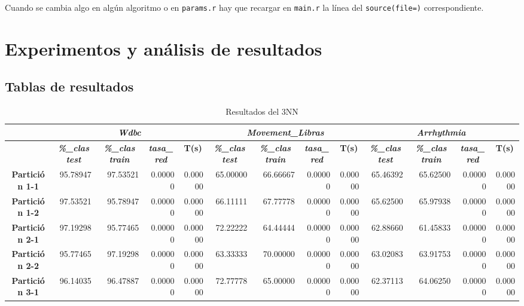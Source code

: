 \documentclass[a4paper,11pt]{article}
\begin{document}
 Cuando se cambia algo en algún algoritmo o en \texttt{params.r} hay que recargar en \texttt{main.r}
 la línea del \texttt{source(file=)} correspondiente.
 
 \section{Experimentos y análisis de resultados}
 \subsection{Tablas de resultados}
 \begin{table}[H]	
    \caption*{Resultados del 3NN}
    \begin{adjustbox}{width=1.1\textwidth}
    \begin{tabular}{|c|r|r|r|r|r|r|r|r|r|r|r|r|}
    \hline
    \multicolumn{1}{|l|}{} & \multicolumn{ 4}{c|}{\textbf{\textit{Wdbc}}} & \multicolumn{ 4}{c|}{\textbf{\textit{Movement\_Libras}}} & \multicolumn{ 4}{c|}{\textbf{\textit{Arrhythmia}}} \\ \hline
    & \multicolumn{1}{c|}{\textbf{\textit{\%\_clas test}}} & \multicolumn{1}{c|}{\textbf{\textit{\%\_clas train}}} & \multicolumn{1}{c|}{\textbf{\textit{tasa\_red}}} & \multicolumn{1}{c|}{\textbf{T(s)}} & \multicolumn{1}{c|}{\textbf{\textit{\%\_clas test}}} & \multicolumn{1}{c|}{\textbf{\textit{\%\_clas train}}} & \multicolumn{1}{c|}{\textbf{\textit{tasa\_red}}} & \multicolumn{1}{c|}{\textbf{T(s)}} & \multicolumn{1}{c|}{\textbf{\textit{\%\_clas test}}} & \multicolumn{1}{c|}{\textbf{\textit{\%\_clas train}}} & \multicolumn{1}{c|}{\textbf{\textit{tasa\_red}}} & \multicolumn{1}{c|}{\textbf{T(s)}} \\ \hline
    \textbf{Partición 1-1} & 95.78947 & 97.53521 & 0.00000 & 0.00000 & 65.00000 & 66.66667 & 0.00000 & 0.00000 & 65.46392 & 65.62500 & 0.00000 & 0.00000 \\ \hline
    \textbf{Partición 1-2} & 97.53521 & 95.78947 & 0.00000 & 0.00000 & 66.11111 & 67.77778 & 0.00000 & 0.00000 & 65.62500 & 65.97938 & 0.00000 & 0.00000 \\ \hline
    \textbf{Partición 2-1} & 97.19298 & 95.77465 & 0.00000 & 0.00000 & 72.22222 & 64.44444 & 0.00000 & 0.00000 & 62.88660 & 61.45833 & 0.00000 & 0.00000 \\ \hline
    \textbf{Partición 2-2} & 95.77465 & 97.19298 & 0.00000 & 0.00000 & 63.33333 & 70.00000 & 0.00000 & 0.00000 & 63.02083 & 63.91753 & 0.00000 & 0.00000 \\ \hline
    \textbf{Partición 3-1} & 96.14035 & 96.47887 & 0.00000 & 0.00000 & 72.77778 & 65.00000 & 0.00000 & 0.00000 & 62.37113 & 64.06250 & 0.00000 & 0.00000 \\ \hline

\end{tabular}
\end{adjustbox}
\end{table}
\end{document}
